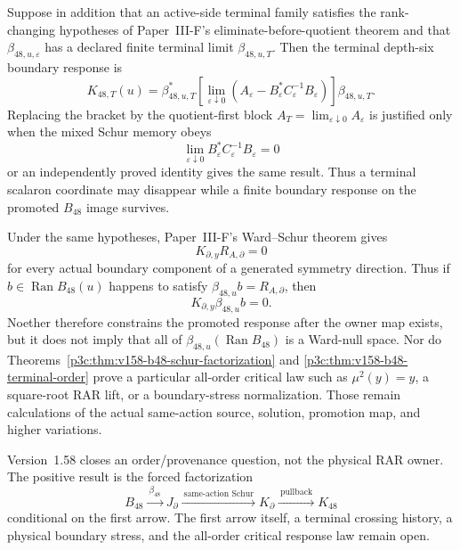 \documentclass[12pt,a4paper]{article}
\begin{document}
\begin{theorem}
\label{p3c:thm:v158-b48-terminal-order}
Suppose in addition that an active-side terminal family satisfies the
rank-changing hypotheses of Paper~III-F's eliminate-before-quotient theorem
and that \(\beta_{48,u,\varepsilon}\) has a declared finite terminal limit
\(\beta_{48,u,T}\).  Then the terminal depth-six boundary response is
\begin{equation}
 \label{p3c:eq:v158-b48-terminal-response}
 \boxed{
 K_{48,T}(u)
 =\beta_{48,u,T}^{*}
 \left[\lim_{\varepsilon\downarrow0}
 \left(A_\varepsilon
       -B_\varepsilon^{*}C_\varepsilon^{-1}B_\varepsilon\right)\right]
 \beta_{48,u,T}.}
\end{equation}
Replacing the bracket by the quotient-first block
\(A_T=\lim_{\varepsilon\downarrow0}A_\varepsilon\) is justified only when the
mixed Schur memory obeys
\[
 \lim_{\varepsilon\downarrow0}
 B_\varepsilon^{*}C_\varepsilon^{-1}B_\varepsilon=0
\]
or an independently proved identity gives the same result.  Thus a terminal
scalaron coordinate may disappear while a finite boundary response on the
promoted \(B_{48}\) image survives.
\end{theorem}

\begin{corollary}
\label{p3c:cor:v158-b48-ward-critical-firewall}
Under the same hypotheses, Paper~III-F's Ward--Schur theorem gives
\[
 K_{\partial,y}R_{A,\partial}=0
\]
for every actual boundary component of a generated symmetry direction.  Thus
if \(b\in\operatorname{Ran}B_{48}(u)\) happens to satisfy
\(\beta_{48,u}b=R_{A,\partial}\), then
\[
 K_{\partial,y}\beta_{48,u}b=0.
\]
Noether therefore constrains the promoted response after the owner map exists,
but it does not imply that all of \(\beta_{48,u}(\operatorname{Ran}B_{48})\)
is a Ward-null space.  Nor do
Theorems~\ref{p3c:thm:v158-b48-schur-factorization} and
\ref{p3c:thm:v158-b48-terminal-order} prove a particular all-order critical
law such as \(\mu^2(y)=y\), a square-root RAR lift, or a boundary-stress
normalization.  Those remain calculations of the actual same-action source,
solution, promotion map, and higher variations.
\end{corollary}

\begin{remark}
\label{p3c:rem:v158-b48-boundary-scope}
Version~1.58 closes an order/provenance question, not the physical RAR owner.
The positive result is the forced factorization
\[
 \boxed{
 B_{48}
 \xrightarrow{\ \beta_{48}\ }
 J_\partial
 \xrightarrow{\ \text{same-action Schur}\ }
 K_\partial
 \xrightarrow{\ \text{pullback}\ }
 K_{48}}
\]
conditional on the first arrow.  The first arrow itself, a terminal crossing
history, a physical boundary stress, and the all-order critical response law
remain open.
\end{remark}
\end{document}

